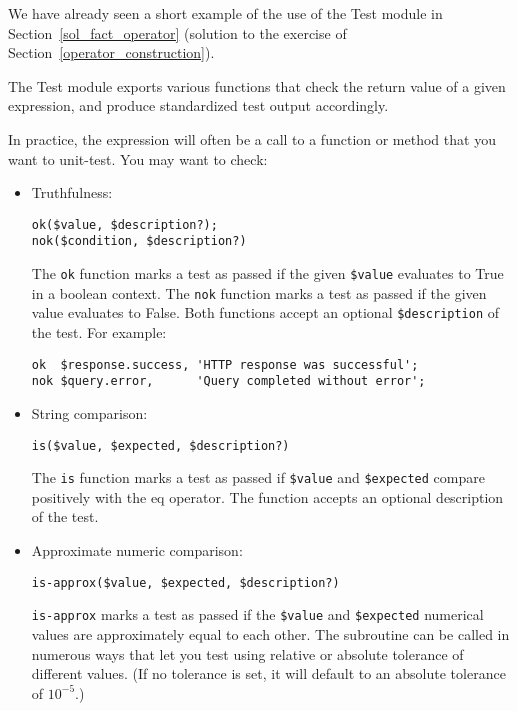 We have already seen a short example of the use of the Test 
module in Section~\ref{sol_fact_operator} (solution 
to the exercise of Section~\ref{operator_construction}).

The Test module exports various functions that check the return 
value of a given expression, and produce standardized test 
output accordingly.

In practice, the expression will often be a call to a function 
or method that you want to unit-test. You may want to check:

\begin{itemize}
\item Truthfulness: 
\begin{verbatim}
ok($value, $description?); 
nok($condition, $description?)
\end{verbatim}

The {\tt ok} function marks a test as passed if the given 
\verb'$value' evaluates to True in a boolean context. The 
{\tt nok} function marks a test as passed if the given value 
evaluates to False. Both functions accept an optional 
\verb'$description' of the test. For example:

\begin{verbatim}
ok  $response.success, 'HTTP response was successful';
nok $query.error,      'Query completed without error';
\end{verbatim}

\item String comparison:
\begin{verbatim}
is($value, $expected, $description?)
\end{verbatim}

The {\tt is} function marks a test as passed if \verb'$value' 
and \verb'$expected' compare positively with the eq operator. 
The function accepts an optional description of the test.

\item Approximate numeric comparison:

\begin{verbatim}
is-approx($value, $expected, $description?)
\end{verbatim}

{\tt is-approx} marks a test as passed if the \verb'$value' and 
\verb'$expected' numerical values are approximately equal 
to each other. The subroutine can be called in numerous ways 
that let you test using relative or absolute tolerance 
of different values. (If no tolerance is set, it will default 
to an absolute tolerance of $10^{-5}$.)


\end{itemize}
